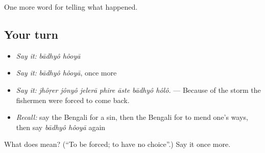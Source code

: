 \begin{grammarlens}[title={What you've built}]
One more word for telling what happened.
\end{grammarlens}

\subsection*{Your turn}
\begin{itemize}
\raggedright
  \item \emph{Say it:} \emph{bādhyô hôoyā}
  \item \emph{Say it:} \emph{bādhyô hôoyā}, once more
  \item \emph{Say it:} \emph{jhôṛer jônyô jelerā phire āste bādhyô hôlô.} — Because of the storm the fishermen were forced to come back.
  \item \emph{Recall:} say the Bengali for a sin, then the Bengali for to mend one's ways, then say \emph{bādhyô hôoyā} again
\end{itemize}

\begin{tcolorbox}[breakable,colback=teal!4,colframe=teal!35!black,title={Before you move on}]
What does   mean? (\textquotedblleft{}To be forced; to have no choice\textquotedblright{}.) Say it once more.
\end{tcolorbox}
